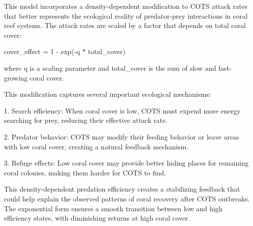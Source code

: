 This model incorporates a density-dependent modification to COTS attack rates that better represents the ecological reality of predator-prey interactions in coral reef systems. The attack rates are scaled by a factor that depends on total coral cover:

cover_effect = 1 - exp(-q * total_cover)

where q is a scaling parameter and total_cover is the sum of slow and fast-growing coral cover.

This modification captures several important ecological mechanisms:

1. Search efficiency: When coral cover is low, COTS must expend more energy searching for prey, reducing their effective attack rate.

2. Predator behavior: COTS may modify their feeding behavior or leave areas with low coral cover, creating a natural feedback mechanism.

3. Refuge effects: Low coral cover may provide better hiding places for remaining coral colonies, making them harder for COTS to find.

This density-dependent predation efficiency creates a stabilizing feedback that could help explain the observed patterns of coral recovery after COTS outbreaks. The exponential form ensures a smooth transition between low and high efficiency states, with diminishing returns at high coral cover.
